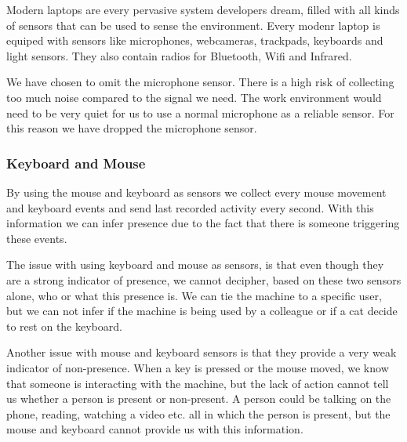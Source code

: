 \documentclass{sigchi}
\begin{document}
Modern laptops are every pervasive system developers dream, filled with all kinds of sensors that can be used to sense the environment.
Every modenr laptop is equiped with sensors like microphones, webcameras, trackpads, keyboards and light sensors.
They also contain radios for Bluetooth, Wifi and Infrared.



We have chosen to omit the microphone sensor.
There is a high risk of collecting too much noise compared to the signal we need.
The work environment would need to be very quiet for us to use a normal microphone as a reliable sensor.
For this reason we have dropped the microphone sensor.

\subsubsection{Keyboard and Mouse}
By using the mouse and keyboard as sensors we collect every mouse movement and keyboard events and send last recorded activity every second.
With this information we can infer presence due to the fact that there is someone triggering these events.

The issue with using keyboard and mouse as sensors, is that even though they are a strong indicator of presence, we cannot decipher, based on these two sensors alone, who or what this presence is.
We can tie the machine to a specific user, but we can not infer if the machine is being used by a colleague or if a cat decide to rest on the keyboard.

Another issue with mouse and keyboard sensors is that they provide a very weak indicator of non-presence.
When a key is pressed or the mouse moved, we know that someone is interacting with the machine, but the lack of action cannot tell us whether a person is present or non-present.
A person could be talking on the phone, reading, watching a video etc. all in which the person is present, but the mouse and keyboard cannot provide us with this information.
\end{document}
